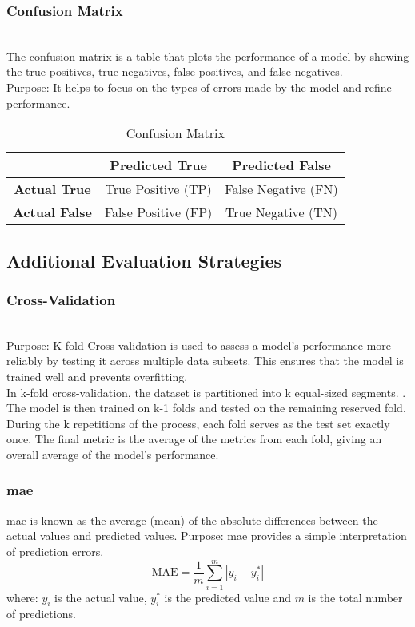 \subsubsection{Confusion Matrix} \leavevmode
\\The confusion matrix is a table that plots the performance of a model by showing the true positives, true negatives, false positives, and false negatives. \\
Purpose: It helps to focus on the types of errors made by the model and refine performance.
\begin{table}[h!]
\centering
\begin{tabular}{|c|c|c|}
\hline
 & \textbf{Predicted True} & \textbf{Predicted False} \\
\hline
\textbf{Actual True} & True Positive (TP) & False Negative (FN) \\
\hline
\textbf{Actual False} & False Positive (FP) & True Negative (TN) \\
\hline
\end{tabular}
\caption{Confusion Matrix}
\label{tab:confusion_matrix}
\end{table}
\vspace{-0.9cm}
\subsection{Additional Evaluation Strategies} \leavevmode \vspace{-0.8cm}
\subsubsection{Cross-Validation} \leavevmode
\\Purpose: K-fold Cross-validation is used to assess a model’s performance more reliably by testing it across multiple data subsets. This ensures that the model is trained well and prevents overfitting. \\In k-fold cross-validation, the dataset is partitioned into k equal-sized segments. \citep{katabathina2024crossvalidation}. The model is then
trained on k-1 folds and tested on the remaining reserved fold. During the k repetitions of the process, each fold serves as the test set exactly once. The final metric is the average of the metrics from each fold, giving an overall average of the model’s performance.

\subsubsection{\gls{mae}} \leavevmode
\gls{mae} is known as the average (mean) of the absolute differences between the actual values and predicted values. Purpose: \gls{mae} provides a simple interpretation of prediction errors. 
\[
\text{MAE} = \frac{1}{m} \sum_{i=1}^{m} \left| y_i - y^*_i \right|
\]
where:
$y_i$ is the actual value, $y^*_i$ is the predicted value and $m$ is the total number of predictions.

